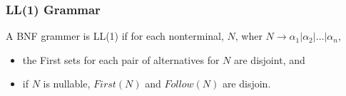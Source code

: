 \subsubsection{LL(1) Grammar}
A BNF grammer is LL(1) if for each nonterminal, $N$, wher $N \rightarrow \alpha_1 | \alpha_2 | \dots | \alpha_n$,
\begin{itemize}
    \item the First sets for each pair of alternatives for $N$ are disjoint, and
    \item if $N$ is nullable, $First(N)$ and $Follow(N)$ are disjoin.
\end{itemize}
